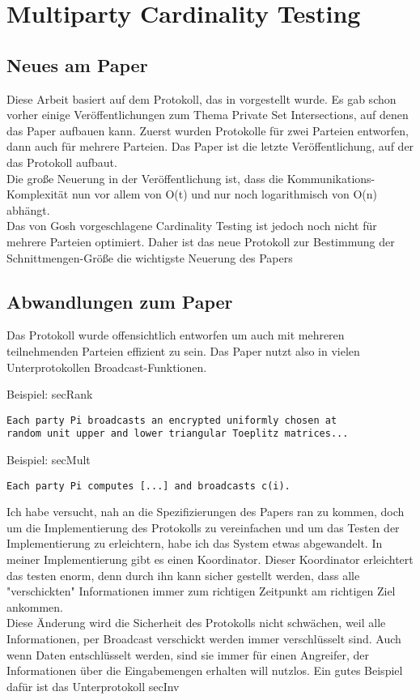 \chapter{Multiparty Cardinality Testing}


\section{Neues am Paper}
Diese Arbeit basiert auf dem Protokoll, das in \cite{Doettling2021} vorgestellt wurde. Es gab schon vorher einige Veröffentlichungen zum Thema Private Set Intersections, auf denen das Paper aufbauen kann. Zuerst wurden Protokolle für zwei Parteien entworfen, dann auch für mehrere Parteien. Das Paper
\cite{Ghosh2019} ist die letzte Veröffentlichung, auf der das Protokoll aufbaut.\\
Die große Neuerung in der Veröffentlichung \cite{Ghosh2019} ist, dass die Kommunikations-Komplexität nun vor allem von O(t) und nur noch logarithmisch von O(n) abhängt. \cite{Ghosh2019}\\
Das von Gosh vorgeschlagene Cardinality Testing ist jedoch noch nicht  für mehrere Parteien optimiert. Daher ist das neue Protokoll zur Bestimmung der Schnittmengen-Größe die wichtigste Neuerung des Papers \cite{Doettling2021}


\section{Abwandlungen zum Paper}
Das Protokoll wurde offensichtlich entworfen um auch mit mehreren teilnehmenden Parteien effizient zu sein.
Das Paper \cite{Doettling2021} nutzt also in vielen Unterprotokollen Broadcast-Funktionen.

Beispiel: secRank \cite{Doettling2021}
\begin{lstlisting}[firstnumber=1]
Each party Pi broadcasts an encrypted uniformly chosen at
random unit upper and lower triangular Toeplitz matrices...
\end{lstlisting}

Beispiel: secMult \cite{Doettling2021}
\begin{lstlisting}[firstnumber=6]
Each party Pi computes [...] and broadcasts c(i).
\end{lstlisting}

Ich habe versucht, nah an die Spezifizierungen des Papers ran zu kommen, doch 
um die Implementierung des Protokolls zu vereinfachen und um das Testen der Implementierung zu erleichtern, habe ich das System etwas abgewandelt. In meiner Implementierung gibt es einen Koordinator. Dieser Koordinator erleichtert das testen enorm, denn durch ihn kann sicher gestellt werden, dass alle "verschickten" Informationen immer zum richtigen Zeitpunkt am richtigen Ziel ankommen.\\
Diese Änderung wird die Sicherheit des Protokolls nicht schwächen, weil alle Informationen, per Broadcast verschickt werden immer verschlüsselt sind.
Auch wenn Daten entschlüsselt werden, sind sie immer für einen Angreifer, der Informationen über die Eingabemengen erhalten will nutzlos. Ein gutes Beispiel dafür ist das Unterprotokoll secInv \\

